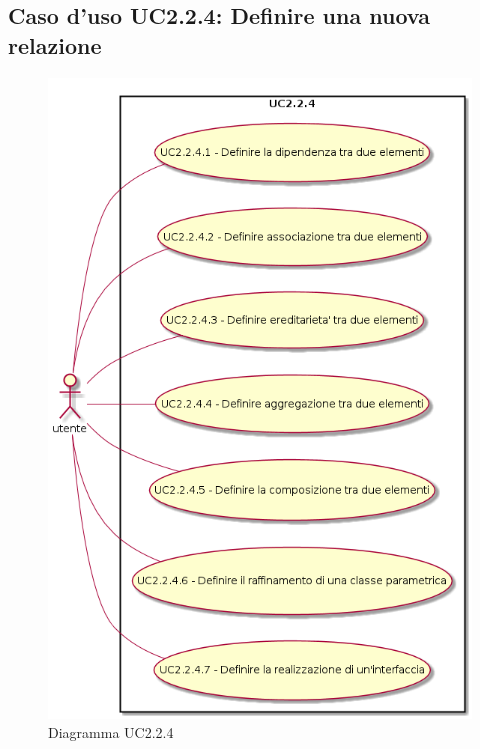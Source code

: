 \documentclass[../AnalisiDeiRequisiti.tex]{subfiles}
\begin{document}
	\subsection{Caso d'uso UC2.2.4: Definire una nuova relazione}
	\begin{figure} [H]
		\centering
		\includegraphics[scale=0.45]{./Figures/UC2.2.4.png}
		\caption{Diagramma UC2.2.4}\label{}
	\end{figure}
\end{document}
